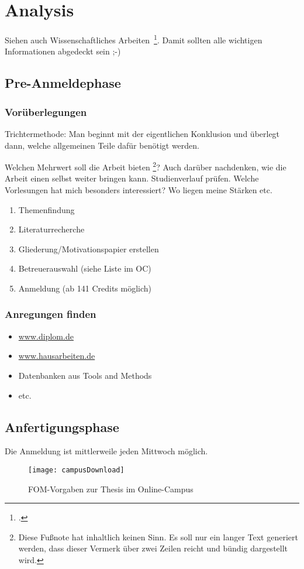 \newpage
\section{Analysis} \label{analysis}
Siehen auch Wissenschaftliches Arbeiten~\footcite[Vgl. ][S. 1]{Balzert.2008}. Damit sollten alle wichtigen Informationen abgedeckt sein ;-)

\subsection{Pre-Anmeldephase}
\subsubsection{Vorüberlegungen}
Trichtermethode: Man beginnt mit der eigentlichen  Konklusion und überlegt dann, welche allgemeinen Teile dafür benötigt werden.

Welchen Mehrwert soll die Arbeit bieten \footnote{Diese Fu\ss note hat inhaltlich keinen Sinn. Es soll nur ein langer Text generiert werden, dass dieser Vermerk über zwei Zeilen reicht und bündig dargestellt wird.}? Auch darüber nachdenken, wie die Arbeit einen selbst weiter bringen kann. Studienverlauf prüfen. Welche Vorlesungen hat mich besonders interessiert? Wo liegen meine Stärken etc.

\begin{enumerate}
\item Themenfindung
\item Literaturrecherche
\item Gliederung/Motivationspapier erstellen
\item Betreuerauswahl (siehe Liste im \ac{OC})
\item Anmeldung (ab 141 Credits möglich)
\end{enumerate}

\subsubsection{Anregungen finden}
\begin{itemize}
\item \href{http://www.diplom.de}{www.diplom.de}
\item \href{http://www.hausarbeiten.de}{www.hausarbeiten.de}
\item Datenbanken aus Tools and Methods
\item etc.
\end{itemize}

\newpage
\subsection{Anfertigungsphase}
Die Anmeldung ist mittlerweile jeden Mittwoch möglich.
\begin{figure}[H]
\caption{FOM-Vorgaben zur Thesis im Online-Campus}
\texttt{[image: campusDownload]}
\\
\cite[Quelle: Vgl.][]{FOM}
\end{figure}

